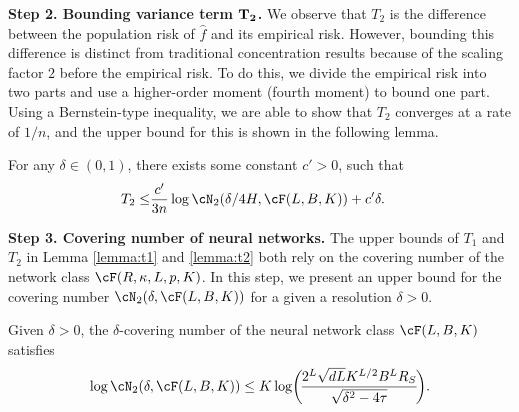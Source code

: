 \textbf{Step 2. Bounding variance term $\bf{T_2}$.}
We observe that $T_2$ is the difference between the population risk of $\hat{f}$ and its empirical risk. However, bounding this difference is distinct from traditional concentration results because of the scaling factor $2$ before the empirical risk. To do this, we divide the empirical risk into two parts and use a higher-order moment (fourth moment) to bound one part. Using a Bernstein-type inequality, we are able to show that $T_2$ converges at a rate of $1/n$, and the upper bound for this is shown in the following lemma.
\begin{lemma}\label{lemma:t2}
For any $\delta \in (0, 1)$, there exists some constant $c'>0$, such that
\begin{align*}
T_2 \leq& \frac{c'}{3n} \log \cN_2(\delta/4H, \cF(L, B, K))+ c'\delta.
\end{align*}
\end{lemma}



\textbf{Step 3. Covering number of neural networks.}
The upper bounds of $T_1$ and $T_2$ in Lemma \ref{lemma:t1} and \ref{lemma:t2} both rely on the covering number of the network class $\cF(R, \kappa, L, p, K)$. In this step, we present an upper bound for the covering number $\cN_2(\delta, \cF(L, B, K) )$ for a given a resolution $\delta > 0$. %
\begin{lemma}\label{lemma:covering-number}
  Given $\delta>0$, the $\delta$-covering number of the neural network class $\cF(L,B,K)$ satisfies
  \begin{align*}
    \log \cN_2(\delta, \cF( L, B,K)) \leq K \log\biggl(\! \frac{2^L \sqrt{dL} K^{L/2} B^L R_S }{\sqrt{\delta^2-4\tau}}\! \biggr).
  \end{align*}
\end{lemma}

